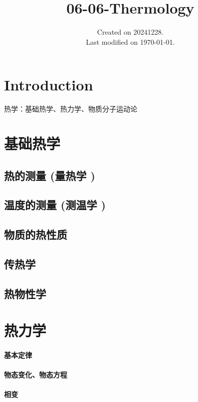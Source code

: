 \documentclass[UTF8]{../06-Physics}
\begin{document}
\title{06-06-Thermology}
\date{Created on 20241228.\\   Last modified on \today.}
\maketitle
\tableofcontents





\chapter{Introduction}
热学：基础热学、热力学、物质分子运动论



\chapter{基础热学}
\section{热的测量 (量热学 )}
\section{温度的测量 (测温学 )}
\section{物质的热性质}
\section{传热学}
\section{热物性学}




\chapter{热力学}
    \subsubsection{基本定律}
    \subsubsection{物态变化、物态方程}
    \subsubsection{相变}
\end{document}
